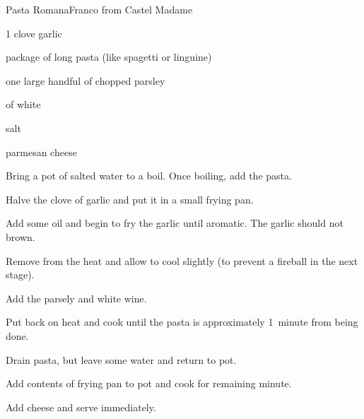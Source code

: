 \begin{recipe}{Pasta Romana}{Franco from Castel Madame}{}

\begin{ingredients}
\item 1 clove garlic
\item \half package of long pasta (like spagetti or linguine)
\item one large handful of chopped parsley
\item \C{\half} of white 
\item {}
\item salt
\item parmesan cheese
\end{ingredients}

\begin{directions}
\item Bring a pot of salted water to a boil. Once boiling, add the pasta.
\item Halve the clove of garlic and put it in a small frying pan.
\item Add some oil and begin to fry the garlic until aromatic. The garlic should not brown.
\item Remove from the heat and allow to cool slightly (to prevent a fireball in the next stage).
\item Add the parsely and white wine.
\item Put back on heat and cook until the pasta is approximately 1~minute from being done.
\item Drain pasta, but leave some water and return to pot.
\item Add contents of frying pan to pot and cook for remaining minute.
\item Add cheese and serve immediately.
\end{directions}

\end{recipe}
